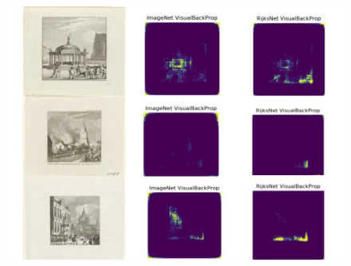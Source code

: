 \begin{figure}[!htb]


\centering
\includegraphics[width=\linewidth]{./Images/Chapter04/selective_attention.jpg}


\end{figure}
